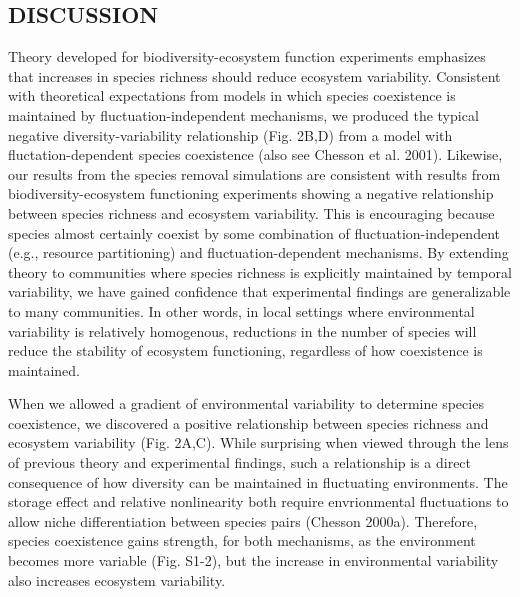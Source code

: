 \documentclass[12pt,]{article}
\begin{document}
\subsection{DISCUSSION}\label{discussion}

Theory developed for biodiversity-ecosystem function experiments
emphasizes that increases in species richness should reduce ecosystem
variability. Consistent with theoretical expectations from models in
which species coexistence is maintained by fluctuation-independent
mechanisms, we produced the typical negative diversity-variability
relationship (Fig. 2B,D) from a model with fluctation-dependent species
coexistence (also see Chesson et al. 2001). Likewise, our results from
the species removal simulations are consistent with results from
biodiversity-ecosystem functioning experiments showing a negative
relationship between species richness and ecosystem variability. This is
encouraging because species almost certainly coexist by some combination
of fluctuation-independent (e.g., resource partitioning) and
fluctuation-dependent mechanisms. By extending theory to communities
where species richness is explicitly maintained by temporal variability,
we have gained confidence that experimental findings are generalizable
to many communities. In other words, in local settings where
environmental variability is relatively homogenous, reductions in the
number of species will reduce the stability of ecosystem functioning,
regardless of how coexistence is maintained.

When we allowed a gradient of environmental variability to determine
species coexistence, we discovered a positive relationship between
species richness and ecosystem variability (Fig. 2A,C). While surprising
when viewed through the lens of previous theory and experimental
findings, such a relationship is a direct consequence of how diversity
can be maintained in fluctuating environments. The storage effect and
relative nonlinearity both require envrionmental fluctuations to allow
niche differentiation between species pairs (Chesson 2000a). Therefore,
species coexistence gains strength, for both mechanisms, as the
environment becomes more variable (Fig. S1-2), but the increase in
environmental variability also increases ecosystem variability.
\end{document}
